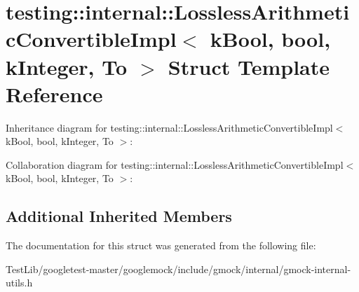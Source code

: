 \hypertarget{structtesting_1_1internal_1_1LosslessArithmeticConvertibleImpl_3_01kBool_00_01bool_00_01kInteger_00_01To_01_4}{}\section{testing\+:\+:internal\+:\+:Lossless\+Arithmetic\+Convertible\+Impl$<$ k\+Bool, bool, k\+Integer, To $>$ Struct Template Reference}
\label{structtesting_1_1internal_1_1LosslessArithmeticConvertibleImpl_3_01kBool_00_01bool_00_01kInteger_00_01To_01_4}


Inheritance diagram for testing\+:\+:internal\+:\+:Lossless\+Arithmetic\+Convertible\+Impl$<$ k\+Bool, bool, k\+Integer, To $>$\+:


Collaboration diagram for testing\+:\+:internal\+:\+:Lossless\+Arithmetic\+Convertible\+Impl$<$ k\+Bool, bool, k\+Integer, To $>$\+:
\subsection*{Additional Inherited Members}


The documentation for this struct was generated from the following file\+:\begin{DoxyCompactItemize}
\item 
Test\+Lib/googletest-\/master/googlemock/include/gmock/internal/gmock-\/internal-\/utils.\+h\end{DoxyCompactItemize}
